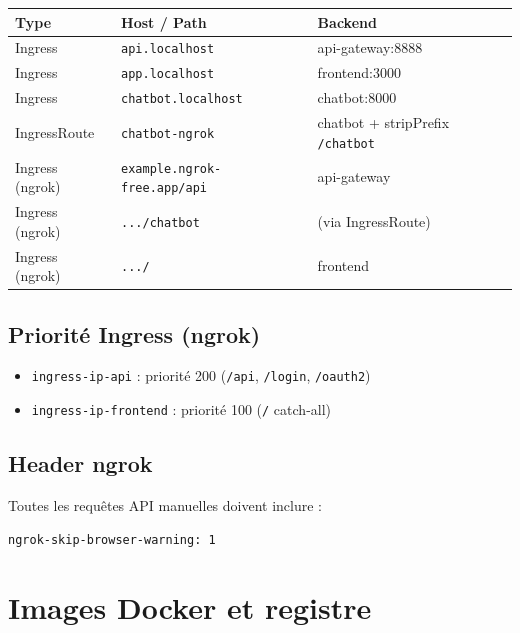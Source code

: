 \documentclass[11pt,a4paper]{article}
\begin{document}
\begin{center}
\begin{tabular}{@{}lll@{}}
\toprule
\textbf{Type} & \textbf{Host / Path} & \textbf{Backend} \\
\midrule
Ingress & \texttt{api.localhost} & api-gateway:8888 \\
Ingress & \texttt{app.localhost} & frontend:3000 \\
Ingress & \texttt{chatbot.localhost} & chatbot:8000 \\
IngressRoute & \texttt{chatbot-ngrok} & chatbot + stripPrefix \texttt{/chatbot} \\
Ingress (ngrok) & \texttt{example.ngrok-free.app/api} & api-gateway \\
Ingress (ngrok) & \texttt{.../chatbot} & (via IngressRoute) \\
Ingress (ngrok) & \texttt{.../} & frontend \\
\bottomrule
\end{tabular}
\end{center}

\subsection{Priorité Ingress (ngrok)}

\begin{itemize}
  \item \texttt{ingress-ip-api} : priorité 200 (\texttt{/api}, \texttt{/login}, \texttt{/oauth2})
  \item \texttt{ingress-ip-frontend} : priorité 100 (\texttt{/} catch-all)
\end{itemize}

\subsection{Header ngrok}

Toutes les requêtes API manuelles doivent inclure :
\begin{lstlisting}
ngrok-skip-browser-warning: 1
\end{lstlisting}

\section{Images Docker et registre}
\end{document}

